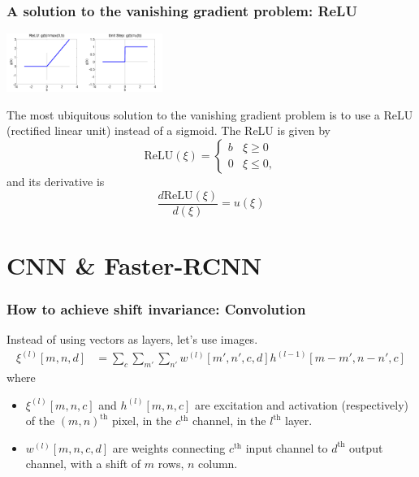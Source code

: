\documentclass{beamer}
\begin{document}
\begin{frame}
  \frametitle{A solution to the vanishing gradient problem: ReLU}
  \centerline{\includegraphics[width=1in]{figs/nn_relu.png}\includegraphics[width=1in]{figs/nn_unitstep.png}}

  The most ubiquitous solution to the vanishing gradient problem is to
  use a ReLU (rectified linear unit) instead of a sigmoid.  The ReLU
  is given by
  \[
  \mbox{ReLU}(\xi) = \begin{cases}
    b & \xi\ge 0\\
    0 & \xi\le 0,
  \end{cases}
  \]
  and its derivative is
  \[
  \frac{d\mbox{ReLU}(\xi)}{d(\xi)}=u(\xi)
  \]
\end{frame}

\section{CNN \& Faster-RCNN}
\setcounter{subsection}{1}

\begin{frame}
  \frametitle{How to achieve shift invariance: Convolution}

  Instead of using vectors as layers, let's use images.
  \begin{align*}
    \xi^{(l)}[m,n,d] &= \sum_c\sum_{m'}\sum_{n'} w^{(l)}[m',n',c,d]h^{(l-1)}[m-m',n-n',c]
  \end{align*}
  where
  \begin{itemize}
  \item $\xi^{(l)}[m,n,c]$ and $h^{(l)}[m,n,c]$ are excitation and
    activation (respectively) of the $(m,n)^{\textrm{th}}$ pixel, in
    the $c^{\textrm{th}}$ channel, in the $l^{\textrm{th}}$ layer.
  \item $w^{(l)}[m,n,c,d]$ are weights connecting $c^{\textrm{th}}$
    input channel to $d^{\textrm{th}}$ output channel, with a shift of
    $m$ rows, $n$ column.
  \end{itemize}
\end{frame}
\end{document}
